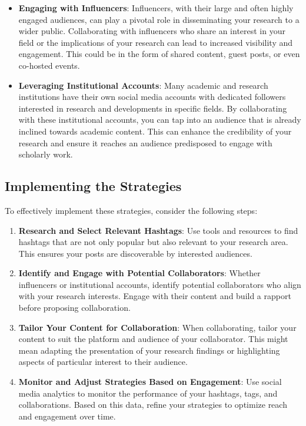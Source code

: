 \documentclass[
]{book}
\begin{document}
\begin{itemize}
\item
  \textbf{Engaging with Influencers}: Influencers, with their large and often highly engaged audiences, can play a pivotal role in disseminating your research to a wider public. Collaborating with influencers who share an interest in your field or the implications of your research can lead to increased visibility and engagement. This could be in the form of shared content, guest posts, or even co-hosted events.
\item
  \textbf{Leveraging Institutional Accounts}: Many academic and research institutions have their own social media accounts with dedicated followers interested in research and developments in specific fields. By collaborating with these institutional accounts, you can tap into an audience that is already inclined towards academic content. This can enhance the credibility of your research and ensure it reaches an audience predisposed to engage with scholarly work.
\end{itemize}

\hypertarget{implementing-the-strategies}{%
\subsection*{Implementing the Strategies}\label{implementing-the-strategies}}

To effectively implement these strategies, consider the following steps:

\begin{enumerate}
\def\labelenumi{\arabic{enumi}.}
\item
  \textbf{Research and Select Relevant Hashtags}: Use tools and resources to find hashtags that are not only popular but also relevant to your research area. This ensures your posts are discoverable by interested audiences.
\item
  \textbf{Identify and Engage with Potential Collaborators}: Whether influencers or institutional accounts, identify potential collaborators who align with your research interests. Engage with their content and build a rapport before proposing collaboration.
\item
  \textbf{Tailor Your Content for Collaboration}: When collaborating, tailor your content to suit the platform and audience of your collaborator. This might mean adapting the presentation of your research findings or highlighting aspects of particular interest to their audience.
\item
  \textbf{Monitor and Adjust Strategies Based on Engagement}: Use social media analytics to monitor the performance of your hashtags, tags, and collaborations. Based on this data, refine your strategies to optimize reach and engagement over time.
\end{enumerate}
\end{document}
